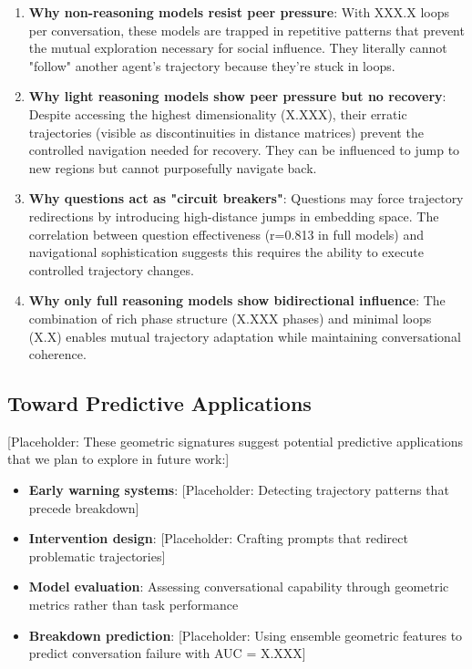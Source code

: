 \documentclass[11pt,letterpaper]{article}
\newcommand{\fullQuestionR}{0.813}
\newcommand{\lightIntrinsicDim}{X.XXX}
\newcommand{\fullPhaseCount}{X.XXX}
\newcommand{\fullLoops}{X.X}
\newcommand{\nonLoops}{XXX.X}
\newcommand{\breakdownPredictionAUC}{X.XXX}
\begin{document}
\begin{enumerate}
\item \textbf{Why non-reasoning models resist peer pressure}: With \nonLoops{} loops per conversation, these models are trapped in repetitive patterns that prevent the mutual exploration necessary for social influence. They literally cannot "follow" another agent's trajectory because they're stuck in loops.

\item \textbf{Why light reasoning models show peer pressure but no recovery}: Despite accessing the highest dimensionality (\lightIntrinsicDim{}), their erratic trajectories (visible as discontinuities in distance matrices) prevent the controlled navigation needed for recovery. They can be influenced to jump to new regions but cannot purposefully navigate back.

\item \textbf{Why questions act as "circuit breakers"}: Questions may force trajectory redirections by introducing high-distance jumps in embedding space. The correlation between question effectiveness (r=\fullQuestionR{} in full models) and navigational sophistication suggests this requires the ability to execute controlled trajectory changes.

\item \textbf{Why only full reasoning models show bidirectional influence}: The combination of rich phase structure (\fullPhaseCount{} phases) and minimal loops (\fullLoops{}) enables mutual trajectory adaptation while maintaining conversational coherence.
\end{enumerate}

\subsection{Toward Predictive Applications}

[Placeholder: These geometric signatures suggest potential predictive applications that we plan to explore in future work:]

\begin{itemize}
\item \textbf{Early warning systems}: [Placeholder: Detecting trajectory patterns that precede breakdown]
\item \textbf{Intervention design}: [Placeholder: Crafting prompts that redirect problematic trajectories]
\item \textbf{Model evaluation}: Assessing conversational capability through geometric metrics rather than task performance
\item \textbf{Breakdown prediction}: [Placeholder: Using ensemble geometric features to predict conversation failure with AUC = \breakdownPredictionAUC{}]
\end{itemize}
\end{document}
